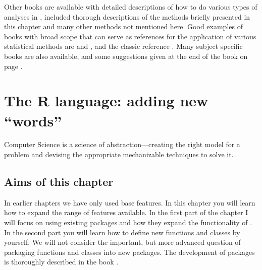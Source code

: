 \documentclass[krantz2]{krantz}\usepackage{knitr}%
\begin{document}
Other books are available with detailed descriptions of how to do various types of analyses in \Rlang, included thorough descriptions of the methods briefly presented in this chapter and many other methods not mentioned here. Good examples of books with broad scope that can serve as references for the application of various statistical methods are  \autocite{Everitt2011} and  \autocite{Crawley2012}, and the classic reference  \autocite{Venables2002}. Many subject specific books are also available, and some suggestions given at the end of the book on page \pageref{chap:R:readings}.






\chapter{The R language: adding new ``words''}\label{chap:R:functions}

\begin{VF}
Computer Science is a science of abstraction---creating the right model for a problem and devising the appropriate mechanizable techniques to solve it.

\end{VF}


\section{Aims of this chapter}

In earlier chapters we have only used base \Rlang features. In this chapter you will learn how to expand the range of features available. In the first part of the chapter I will focus on using existing packages and how they expand the functionality of \Rlang. In the second part you will learn how to define new functions and classes by yourself. We will not consider the important, but more advanced question of packaging functions and classes into new packages. The development of packages is thoroughly described in the book  \autocite{Wickham2015}.
\end{document}
